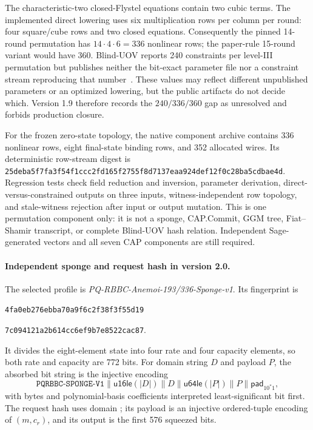 \documentclass[11pt]{article}
\begin{document}
The characteristic-two closed-Flystel equations contain two cubic terms.  The
implemented direct lowering uses six multiplication rows per column per round:
four square/cube rows and two closed equations.  Consequently the pinned
14-round permutation has $14\cdot4\cdot6=336$ nonlinear rows; the paper-rule
15-round variant would have 360.  Blind-UOV reports 240 constraints per
level-III permutation but publishes neither the bit-exact parameter file nor a
constraint stream reproducing that number~\cite{blind-uov}.  These values may
reflect different unpublished parameters or an optimized lowering, but the
public artifacts do not decide which.  Version 1.9 therefore records the
$240/336/360$ gap as unresolved and forbids production closure.

For the frozen zero-state topology, the native component archive contains 336
nonlinear rows, eight final-state binding rows, and 352 allocated wires.  Its
deterministic row-stream digest is
\texttt{25deba5f7fa3f54f1ccc2fd165f2755f8d7137eaa924def12f0c28ba5cdbae4d}.
Regression tests check field reduction and inversion, parameter derivation,
direct-versus-constrained outputs on three inputs, witness-independent row
topology, and stale-witness rejection after input or output mutation.  This is
one permutation component only: it is not a sponge, CAP.Commit, GGM tree,
Fiat--Shamir transcript, or complete Blind-UOV hash relation.  Independent
Sage-generated vectors and all seven CAP components are still required.

\paragraph{Independent sponge and request hash in version 2.0.}
The selected profile is
\emph{PQ-RBBC-Anemoi-193/336-Sponge-v1}.  Its fingerprint is
\begin{center}
\texttt{4fa0eb276ebba70a9f6c2f38f3f55d19}\par\vspace{-0.2em}
\texttt{7c094121a2b614cc6ef9b7e8522cac87}.
\end{center}
It divides the eight-element state into four rate and four capacity elements,
so both rate and capacity are 772 bits.  For domain string $D$ and payload $P$,
the absorbed bit string is the injective encoding
\[
 \mathtt{PQRBBC\mbox{-}SPONGE\mbox{-}V1}
 \|\mathsf{u16le}(|D|)\|D\|\mathsf{u64le}(|P|)\|P\|\mathsf{pad}_{10^*1},
\]
with bytes and polynomial-basis coefficients interpreted least-significant bit
first.  The request hash uses domain
; its payload is an injective ordered-tuple encoding
of $(m,c_r)$, and its output is the first 576 squeezed bits.
\end{document}
